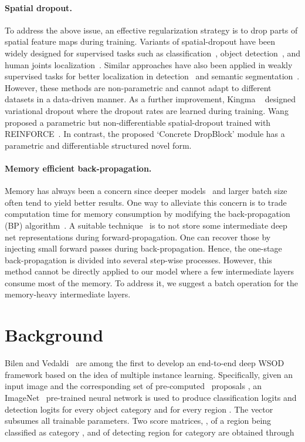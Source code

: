 \documentclass[10pt,twocolumn,letterpaper]{article}
\begin{document}
\vspace{-1em}
\paragraph{Spatial dropout.}
To address the above issue, an effective regularization strategy is to drop parts of spatial feature maps during training. Variants of spatial-dropout have been widely designed for supervised tasks such as classification~\cite{dropblock}, object detection~\cite{a-fast-rcnn}, and human joints localization~\cite{TompsonGJLB15}. Similar approaches have also been applied in weakly supervised tasks for better localization in detection~\cite{singh-iccv2017} and semantic segmentation~\cite{WeiFLCZY17}. However, these methods are non-parametric and cannot adapt to different datasets in a data-driven manner. As a further improvement, Kingma \etal~\cite{varitional-db} designed variational dropout where the dropout rates are learned during training. Wang \etal~\cite{a-fast-rcnn} proposed a parametric but non-differentiable spatial-dropout trained with REINFORCE~\cite{reinforce}. In contrast, the proposed `Concrete DropBlock' module has a parametric and differentiable structured novel form.

\vspace{-1em}
\paragraph{\textbf{Memory efficient back-propagation.}}
Memory has always been a concern since deeper models~\cite{resnet,vgg} and larger batch size~\cite{Peng_2018_CVPR} often tend to yield better results. One way to alleviate this concern is to trade computation time for memory consumption by modifying the back-propagation (BP) algorithm~\cite{Rumelhart}. A suitable technique~\cite{Kokkinos17,PleissCHLMW17, ChenXZG16} is to not store some intermediate deep net representations during forward-propagation. One can recover those by injecting small forward passes during  back-propagation. Hence, the one-stage back-propagation is divided into several step-wise processes. However, this method cannot be directly applied to our model where a few intermediate layers consume most of the memory. To address it, we suggest a batch operation for the memory-heavy intermediate layers. 
 \section{Background}
\label{bcakground}
Bilen and Vedaldi~\cite{Bilen16} are among the first to develop an end-to-end deep WSOD framework based on the idea of multiple instance learning. Specifically, given an input image  and the corresponding set of pre-computed~\cite{ss, eb} proposals  , an ImageNet~\cite{imagenet} pre-trained neural network is used to produce classification logits  and detection logits  for every object category  and for every region . The vector  subsumes all trainable parameters. Two score matrices, \ie,  of a region  being classified as category , and  of detecting region  for category   are obtained through 
 
\end{document}
